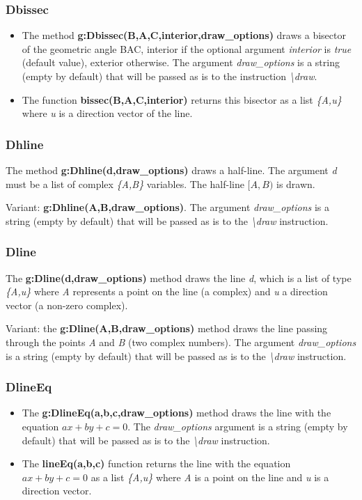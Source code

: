 \subsubsection{Dbissec}
\begin{itemize}
    \item The method \textbf{g:Dbissec(B,A,C,interior,draw\_options)} draws a bisector of the geometric angle BAC, interior if the optional argument \emph{interior} is \emph{true} (default value), exterior otherwise. The argument \emph{draw\_options} is a string (empty by default) that will be passed as is to the instruction
\emph{\textbackslash draw}.
    \item The function \textbf{bissec(B,A,C,interior)} returns this bisector as a list \emph{\{A,u\}} where \emph{u} is a direction vector of the line. \end{itemize}

\subsubsection{Dhline}
The method \textbf{g:Dhline(d,draw\_options)} draws a half-line. The argument \emph{d} must be a list of complex \emph{\{A,B\}} variables. The half-line $[A,B)$ is drawn.

Variant: \textbf{g:Dhline(A,B,draw\_options)}. The argument \emph{draw\_options} is a string (empty by default) that will be passed as is to the \emph{\textbackslash draw} instruction.

\subsubsection{Dline}
The \textbf{g:Dline(d,draw\_options)} method draws the line \emph{d}, which is a list of type \emph{\{A,u\}} where \emph{A} represents a point on the line (a complex) and \emph{u} a direction vector (a non-zero complex).

Variant: the \textbf{g:Dline(A,B,draw\_options)} method draws the line passing through the points \emph{A} and \emph{B} (two complex numbers). The argument \emph{draw\_options} is a string (empty by default) that will be passed as is to the \emph{\textbackslash draw} instruction.

\subsubsection{DlineEq}
\begin{itemize}
    \item The \textbf{g:DlineEq(a,b,c,draw\_options)} method draws the line with the equation \(ax+by+c=0\). The \emph{draw\_options} argument is a string (empty by default) that will be passed as is to the \emph{\textbackslash draw} instruction.
    \item The \textbf{lineEq(a,b,c)} function returns the line with the equation \(ax+by+c=0\) as a list \emph{\{A,u\}} where \emph{A} is a point on the line and \emph{u} is a direction vector. \end{itemize}

